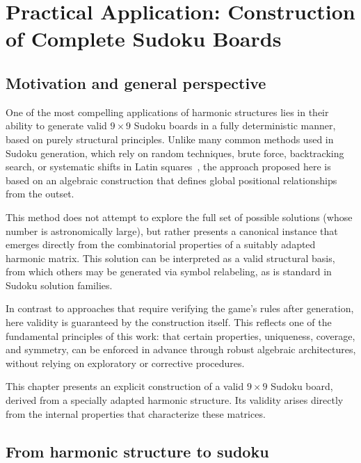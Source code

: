 \documentclass{article}
\begin{document}
\section{Practical Application: Construction of Complete Sudoku Boards}

\subsection{Motivation and general perspective}

One of the most compelling applications of harmonic structures lies in their ability to generate valid \(9 \times 9\) Sudoku boards in a fully deterministic manner, based on purely structural principles. Unlike many common methods used in Sudoku generation, which rely on random techniques, brute force, backtracking search, or systematic shifts in Latin squares~\cite{latin-squares}, the approach proposed here is based on an algebraic construction that defines global positional relationships from the outset.

\medskip

This method does not attempt to explore the full set of possible solutions (whose number is astronomically large), but rather presents a canonical instance that emerges directly from the combinatorial properties of a suitably adapted harmonic matrix. This solution can be interpreted as a valid structural basis, from which others may be generated via symbol relabeling, as is standard in Sudoku solution families.

\medskip

In contrast to approaches that require verifying the game's rules after generation, here validity is guaranteed by the construction itself. This reflects one of the fundamental principles of this work: that certain properties, uniqueness, coverage, and symmetry, can be enforced in advance through robust algebraic architectures, without relying on exploratory or corrective procedures.

\medskip


This chapter presents an explicit construction of a valid \(9 \times 9\) Sudoku board, derived from a specially adapted harmonic structure. Its validity arises directly from the internal properties that characterize these matrices.

\subsection{From harmonic structure to sudoku}
\end{document}
